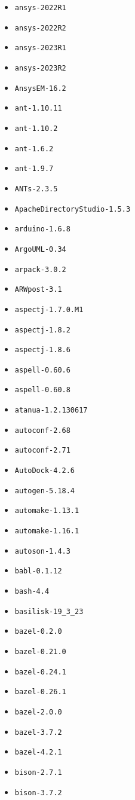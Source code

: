 \begin{multicols}{3}
\begin{itemize}
\item \verb|ansys-2022R1|
\item \verb|ansys-2022R2|
\item \verb|ansys-2023R1|
\item \verb|ansys-2023R2|
\item \verb|AnsysEM-16.2|
\item \verb|ant-1.10.11|
\item \verb|ant-1.10.2|
\item \verb|ant-1.6.2|
\item \verb|ant-1.9.7|
\item \verb|ANTs-2.3.5|
\item \verb|ApacheDirectoryStudio-1.5.3|
\item \verb|arduino-1.6.8|
\item \verb|ArgoUML-0.34|
\item \verb|arpack-3.0.2|
\item \verb|ARWpost-3.1|
\item \verb|aspectj-1.7.0.M1|
\item \verb|aspectj-1.8.2|
\item \verb|aspectj-1.8.6|
\item \verb|aspell-0.60.6|
\item \verb|aspell-0.60.8|
\item \verb|atanua-1.2.130617|
\item \verb|autoconf-2.68|
\item \verb|autoconf-2.71|
\item \verb|AutoDock-4.2.6|
\item \verb|autogen-5.18.4|
\item \verb|automake-1.13.1|
\item \verb|automake-1.16.1|
\item \verb|autoson-1.4.3|
\item \verb|babl-0.1.12|
\item \verb|bash-4.4|
\item \verb|basilisk-19_3_23|
\item \verb|bazel-0.2.0|
\item \verb|bazel-0.21.0|
\item \verb|bazel-0.24.1|
\item \verb|bazel-0.26.1|
\item \verb|bazel-2.0.0|
\item \verb|bazel-3.7.2|
\item \verb|bazel-4.2.1|
\item \verb|bison-2.7.1|
\item \verb|bison-3.7.2|

\end{itemize}
\end{multicols}
